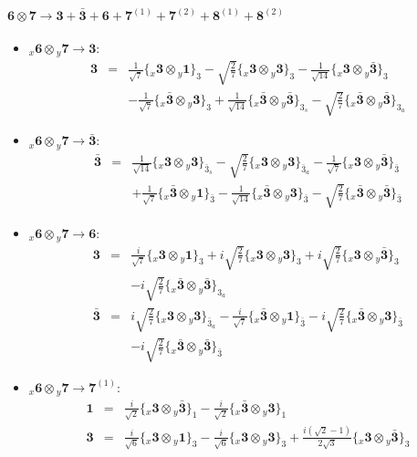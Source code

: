 \documentclass[english]{article}
\newcommand{\rep}[1]{\mathbf{#1}}
\newcommand{\repx}[2]{{}_{#2}\mathbf{#1}}
\newcommand{\subcg}[3]{\big\{ \repx{#1}{x}\otimes\repx{#2}{y}\big\}^{}_{#3}}
\begin{document}
\paragraph*{\Large $\rep{6}\otimes\rep{7}\to\rep{3}+\rep{\bar{3}}+\rep{6}+\rep{7}^{(1)}+\rep{7}^{(2)}+\rep{8}^{(1)}+\rep{8}^{(2)}$}
\begin{itemize}
\item $\repx{6}{x}\otimes\repx{7}{y}\to\rep{3}$:
\begin{eqnarray*}
\rep{3} &=& \frac{1}{\sqrt{7}}\subcg{3}{1}{3}-\sqrt{\frac{2}{7}}\subcg{3}{3}{3}-\frac{1}{\sqrt{14}}\subcg{3}{\bar{3}}{3} \\ 
 & & -\frac{1}{\sqrt{7}}\subcg{\bar{3}}{3}{3}+\frac{1}{\sqrt{14}}\subcg{\bar{3}}{\bar{3}}{3_{s}}-\sqrt{\frac{2}{7}}\subcg{\bar{3}}{\bar{3}}{3_{a}}
\end{eqnarray*}
\item $\repx{6}{x}\otimes\repx{7}{y}\to\rep{\bar{3}}$:
\begin{eqnarray*}
\rep{\bar{3}} &=& \frac{1}{\sqrt{14}}\subcg{3}{3}{\bar{3}_{s}}-\sqrt{\frac{2}{7}}\subcg{3}{3}{\bar{3}_{a}}-\frac{1}{\sqrt{7}}\subcg{3}{\bar{3}}{\bar{3}} \\ 
 & & +\frac{1}{\sqrt{7}}\subcg{\bar{3}}{1}{\bar{3}}-\frac{1}{\sqrt{14}}\subcg{\bar{3}}{3}{\bar{3}}-\sqrt{\frac{2}{7}}\subcg{\bar{3}}{\bar{3}}{\bar{3}}
\end{eqnarray*}
\item $\repx{6}{x}\otimes\repx{7}{y}\to\rep{6}$:
\begin{eqnarray*}
\rep{3} &=& \frac{i}{\sqrt{7}}\subcg{3}{1}{3}+i \sqrt{\frac{2}{7}}\subcg{3}{3}{3}+i \sqrt{\frac{2}{7}}\subcg{3}{\bar{3}}{3} \\ 
 & & -i \sqrt{\frac{2}{7}}\subcg{\bar{3}}{\bar{3}}{3_{a}}
\\
\rep{\bar{3}} &=& i \sqrt{\frac{2}{7}}\subcg{3}{3}{\bar{3}_{a}}-\frac{i}{\sqrt{7}}\subcg{\bar{3}}{1}{\bar{3}}-i \sqrt{\frac{2}{7}}\subcg{\bar{3}}{3}{\bar{3}} \\ 
 & & -i \sqrt{\frac{2}{7}}\subcg{\bar{3}}{\bar{3}}{\bar{3}}
\end{eqnarray*}
\item $\repx{6}{x}\otimes\repx{7}{y}\to\rep{7}^{(1)}$:
\begin{eqnarray*}
\rep{1} &=& \frac{i}{\sqrt{2}}\subcg{3}{\bar{3}}{1}-\frac{i}{\sqrt{2}}\subcg{\bar{3}}{3}{1}
\\
\rep{3} &=& \frac{i}{\sqrt{6}}\subcg{3}{1}{3}-\frac{i}{\sqrt{6}}\subcg{3}{3}{3}+\frac{i \left(\sqrt{2}-1\right)}{2 \sqrt{3}}\subcg{3}{\bar{3}}{3} \\ 

\end{eqnarray*}
\end{itemize}
\end{document}
